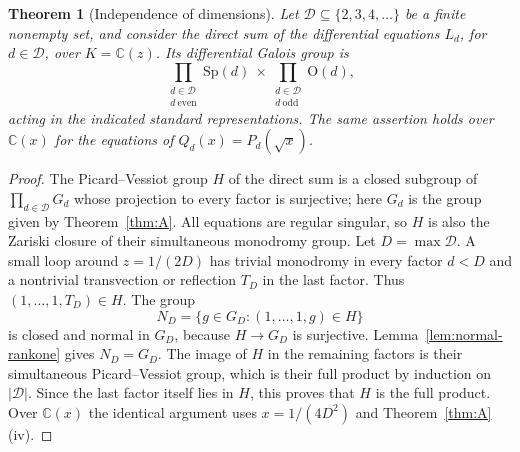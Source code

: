 \documentclass[11pt]{amsart}
\newtheorem{thm}{Theorem}[section]
\theoremstyle{definition}
\newcommand{\C}{\mathbb C}
\newcommand{\Sp}{\mathrm{Sp}}
\newcommand{\Ort}{\mathrm{O}}
\begin{document}
\begin{thm}[Independence of dimensions]\label{thm:joint-hypercubic}
Let $\mathcal D\subseteq\{2,3,4,\ldots\}$ be a finite nonempty set,
and consider the direct sum of the differential equations $L_d$, for
$d\in\mathcal D$, over $K=\C(z)$.  Its differential Galois group is
\[
 \prod_{\substack{d\in\mathcal D\\d\ \mathrm{even}}}\Sp(d)
 \ \times\!
 \prod_{\substack{d\in\mathcal D\\d\ \mathrm{odd}}}\Ort(d),
\]
acting in the indicated standard representations.
The same assertion holds over $\C(x)$ for the equations of
$Q_d(x)=P_d(\sqrt{x})$.
\end{thm}
\begin{proof}
The Picard--Vessiot group $H$ of the direct sum is a closed subgroup of
$\prod_{d\in\mathcal D}G_d$ whose projection to every factor is
surjective; here $G_d$ is the group given by Theorem~\ref{thm:A}.
All equations are regular singular, so $H$ is also the Zariski closure
of their simultaneous monodromy group.
Let $D=\max\mathcal D$.  A small loop around $z=1/(2D)$ has trivial
monodromy in every factor $d<D$ and a nontrivial transvection or
reflection $T_D$ in the last factor.  Thus
$(1,\ldots,1,T_D)\in H$.
The group
\[
 N_D=\{g\in G_D:(1,\ldots,1,g)\in H\}
\]
is closed and normal in $G_D$, because $H\longrightarrow G_D$ is
surjective.  Lemma~\ref{lem:normal-rankone} gives $N_D=G_D$.
The image of $H$ in the remaining factors is their simultaneous
Picard--Vessiot group, which is their full product by induction on
$|\mathcal D|$.  Since the last factor itself lies in $H$, this proves
that $H$ is the full product.  Over $\C(x)$ the identical argument uses
$x=1/(4D^2)$ and Theorem~\ref{thm:A}(iv).
\end{proof}
\end{document}
